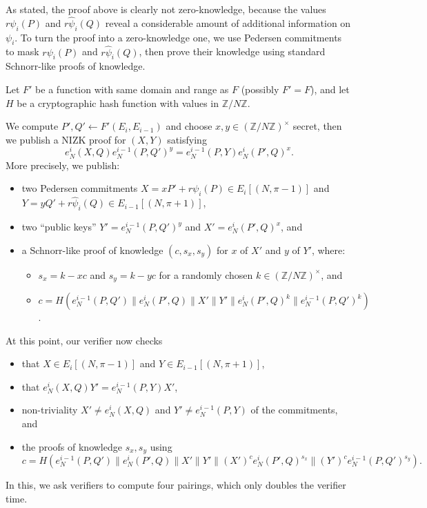 \documentclass{llncs}
\newcommand{\Z}{\mathbb{Z}}
\begin{document}
As stated, the proof above is clearly not zero-knowledge, because the
values $r\psi_i(P)$ and $r\hat\psi_i(Q)$ reveal a considerable amount
of additional information on $\psi_i$.  %
To turn the proof into a zero-knowledge one, we use Pedersen
commitments to mask $r\psi_i(P)$ and $r\hat\psi_i(Q)$, then prove
their knowledge using standard Schnorr-like proofs of knowledge.

Let $F'$ be a function with same domain and range as $F$ (possibly
$F'=F$), and let $H$ be a cryptographic hash function with values in
$\Z/N\Z$.

We compute $P',Q' \gets F'(E_i,E_{i-1})$ and choose
$x,y\in(\Z/N\Z)^\times$ secret, then we publish a NIZK proof for
$(X,Y)$ satisfying
$$ e_N^i(X,Q) e_N^{i-1}(P,Q')^y  = e_N^{i-1}(P,Y) e_N^i(P',Q)^x . $$
More precisely, we publish:
\begin{itemize}
\item two Pedersen commitments 
 $X = x P' + r\psi_i(P) \in E_i[(N,\pi-1)]$ and
 $Y = y Q' + r\hat\psi_i(Q) \in E_{i-1}[(N,\pi+1)]$,
\item two ``public keys'' $Y' = e_N^{i-1}(P,Q')^y$ and $X' = e_N^i(P',Q)^x$, and
\item a Schnorr-like proof of knowledge $(c,s_x,s_y)$ for $x$ of $X'$ and $y$ of $Y'$,
  where:
  \begin{itemize}
  \item $s_x = k - xc$ and $s_y = k - yc$ for a randomly chosen
    $k \in (\Z/N\Z)^\times$, and
  \item
    $c = H( e_N^{i-1}(P,Q') \| e_N^i(P',Q) \| X' \| Y' \|
    e_N^i(P',Q)^{k} \| e_N^{i-1}(P,Q')^k )$.
  \end{itemize}
\end{itemize}
At this point, our verifier now checks 
\begin{itemize}
\item that $X \in E_i[(N,\pi-1)]$ and $Y \in E_{i-1}[(N,\pi+1)]$,
\item that $e_N^i(X,Q) Y' = e_N^{i-1}(P,Y) X'$,
\item non-triviality $X' \ne e_N^i(X,Q)$ and $Y' \ne e_N^{i-1}(P,Y)$ of the commitments, and
\item the proofs of knowledge $s_x,s_y$ using
$$ c = H( 
  e_N^{i-1}(P,Q') \| e_N^i(P',Q) \| 
  X' \| Y' \| 
  (X')^c e_N^i(P',Q)^{s_x} \| 
  (Y')^c e_N^{i-1}(P,Q')^{s_y} 
). $$
\end{itemize}
In this, we ask verifiers to compute four pairings, which only doubles
the verifier time.
\end{document}
